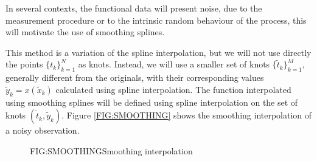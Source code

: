 In several contexts, the functional data will present noise, due to the
measurement procedure or to the intrinsic random behaviour of the process,
this will motivate the use of smoothing splines.

This method is a variation of the spline interpolation, but we will not
use directly the points $\{t_k\}_{k=1}^{N}$ as knots. Instead, we will use a
smaller set of knots $\{\tilde t_k\}_{k=1}^{M}$, generally different from the
originals, with their corresponding values $\tilde y_k = x(\tilde x_k)$
calculated using spline interpolation. The function interpolated using smoothing
splines will be defined using spline interpolation on the set of knots
$(\tilde t_k, \tilde y_k)$. Figure \ref{FIG:SMOOTHING} shows the smoothing
interpolation of a noisy observation.

\begin{figure}[Example of smoothing spline interpolation]{FIG:SMOOTHING}{Smoothing interpolation}
\end{figure}
